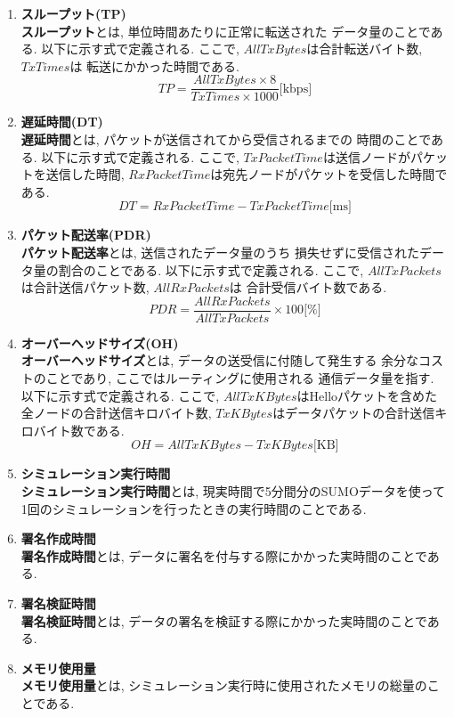 \begin{enumerate}
  \item \textbf{スループット(TP)}\\
  \indent \textbf{スループット}とは, 単位時間あたりに正常に転送された
  データ量のことである. 以下に示す式で定義される. ここで, 
  $AllTxBytes$は合計転送バイト数, $TxTimes$は
  転送にかかった時間である. \\
  \[
    TP = \frac{AllTxBytes\times 8}{TxTimes\times 1000}\text{[kbps]}
  \]
  \item \textbf{遅延時間(DT)}\\
  \indent \textbf{遅延時間}とは, パケットが送信されてから受信されるまでの
  時間のことである. 以下に示す式で定義される. ここで,
  $TxPacketTime$は送信ノードがパケットを送信した時間, 
  $RxPacketTime$は宛先ノードがパケットを受信した時間である. \\
  \[
    DT = RxPacketTime - TxPacketTime \text{[ms]}
  \]

  \item \textbf{パケット配送率(PDR)}\\
  \indent \textbf{パケット配送率}とは, 送信されたデータ量のうち
  損失せずに受信されたデータ量の割合のことである. 以下に示す式で定義される. 
  ここで, $AllTxPackets$は合計送信パケット数, $AllRxPackets$は
  合計受信バイト数である. \\
  \[
    PDR = \frac{AllRxPackets}{AllTxPackets} \times 100 \text{[\%]}
  \]

  \item \textbf{オーバーヘッドサイズ(OH)}\\
  \indent \textbf{オーバーヘッドサイズ}とは, データの送受信に付随して発生する
  余分なコストのことであり, ここではルーティングに使用される
  通信データ量を指す. 以下に示す式で定義される. ここで, 
  $AllTxKBytes$はHelloパケットを含めた全ノードの合計送信キロバイト数, 
  $TxKBytes$はデータパケットの合計送信キロバイト数である. \\
  \[
    OH = AllTxKBytes - TxKBytes \text{[KB]}
  \]

  \item \textbf{シミュレーション実行時間}\\
  \indent \textbf{シミュレーション実行時間}とは, 現実時間で5分間分のSUMOデータを使って
  1回のシミュレーションを行ったときの実行時間のことである. 

  \item \textbf{署名作成時間}\\
  \indent \textbf{署名作成時間}とは, データに署名を付与する際にかかった実時間のことである. 

  \item \textbf{署名検証時間}\\
  \indent \textbf{署名検証時間}とは, データの署名を検証する際にかかった実時間のことである.

  \item \textbf{メモリ使用量}\\
  \indent \textbf{メモリ使用量}とは, シミュレーション実行時に使用されたメモリの総量のことである.
\end{enumerate}
\vspace{2em}

